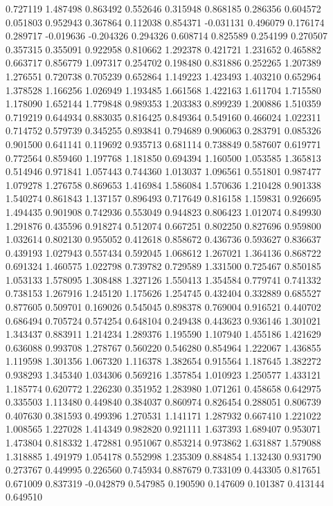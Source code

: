 0.727119
1.487498
0.863492
0.552646
0.315948
0.868185
0.286356
0.604572
0.051803
0.952943
0.367864
0.112038
0.854371
-0.031131
0.496079
0.176174
0.289717
-0.019636
-0.204326
0.294326
0.608714
0.825589
0.254199
0.270507
0.357315
0.355091
0.922958
0.810662
1.292378
0.421721
1.231652
0.465882
0.663717
0.856779
1.097317
0.254702
0.198480
0.831886
0.252265
1.207389
1.276551
0.720738
0.705239
0.652864
1.149223
1.423493
1.403210
0.652964
1.378528
1.166256
1.026949
1.193485
1.661568
1.422163
1.611704
1.715580
1.178090
1.652144
1.779848
0.989353
1.203383
0.899239
1.200886
1.510359
0.719219
0.644934
0.883035
0.816425
0.849364
0.549160
0.466024
1.022311
0.714752
0.579739
0.345255
0.893841
0.794689
0.906063
0.283791
0.085326
0.901500
0.641141
0.119692
0.935713
0.681114
0.738849
0.587607
0.619771
0.772564
0.859460
1.197768
1.181850
0.694394
1.160500
1.053585
1.365813
0.514946
0.971841
1.057443
0.744360
1.013037
1.096561
0.551801
0.987477
1.079278
1.276758
0.869653
1.416984
1.586084
1.570636
1.210428
0.901338
1.540274
0.861843
1.137157
0.896493
0.717649
0.816158
1.159831
0.926695
1.494435
0.901908
0.742936
0.553049
0.944823
0.806423
1.012074
0.849930
1.291876
0.435596
0.918274
0.512074
0.667251
0.802250
0.827696
0.959800
1.032614
0.802130
0.955052
0.412618
0.858672
0.436736
0.593627
0.836637
0.439193
1.027943
0.557434
0.592045
1.068612
1.267021
1.364136
0.868722
0.691324
1.460575
1.022798
0.739782
0.729589
1.331500
0.725467
0.850185
1.053133
1.578095
1.308488
1.327126
1.550413
1.354584
0.779741
0.741332
0.738153
1.267916
1.245120
1.175626
1.254745
0.432404
0.332889
0.685527
0.877605
0.509701
0.169026
0.545045
0.898378
0.769004
0.916521
0.440702
0.686494
0.705724
0.574254
0.648104
0.249438
0.443623
0.936146
1.301021
1.343437
0.883911
1.214234
1.289376
1.195590
1.107940
1.455186
1.421629
0.636088
0.993708
1.278767
0.560220
0.546280
0.854964
1.222067
1.436855
1.119598
1.301356
1.067320
1.116378
1.382654
0.915564
1.187645
1.382272
0.938293
1.345340
1.034306
0.569216
1.357854
1.010923
1.250577
1.433121
1.185774
0.620772
1.226230
0.351952
1.283980
1.071261
0.458658
0.642975
0.335503
1.113480
0.449840
0.384037
0.860974
0.826454
0.288051
0.806739
0.407630
0.381593
0.499396
1.270531
1.141171
1.287932
0.667410
1.221022
1.008565
1.227028
1.414349
0.982820
0.921111
1.637393
1.689407
0.953071
1.473804
0.818332
1.472881
0.951067
0.853214
0.973862
1.631887
1.579088
1.318885
1.491979
1.054178
0.552998
1.235309
0.884854
1.132430
0.931790
0.273767
0.449995
0.226560
0.745934
0.887679
0.733109
0.443305
0.817651
0.671009
0.837319
-0.042879
0.547985
0.190590
0.147609
0.101387
0.413144
0.649510
